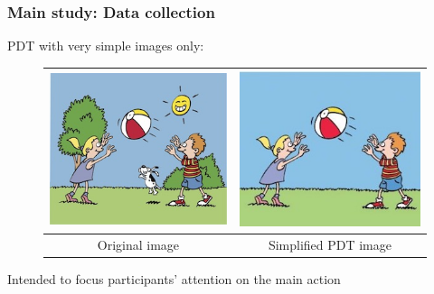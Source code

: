 \documentclass[handout,xcolor={dvipsnames}]{beamer}
\begin{document}
\begin{frame}
\frametitle{Main study: Data collection}
\medskip

PDT with very simple images only:

\begin{figure}[htb!]
\begin{center}
\begin{tabular}{|c|c|}
\hline
{\includegraphics[width=0.38\columnwidth]{figures/throw-original.jpg}} & {\includegraphics[width=0.38\columnwidth]{figures/I21cropped.jpg}} \\
\hline
Original image & Simplified PDT image \\
\hline
\end{tabular}
\end{center}
\end{figure}

Intended to focus participants' attention on the main action
\end{frame}
\end{document}
